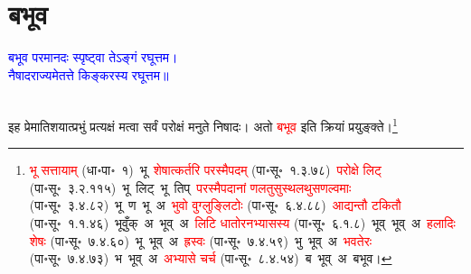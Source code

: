 \section[बभूव]{बभूव}
\centering\textcolor{blue}{बभूव परमानदः स्पृष्ट्वा तेऽङ्गं रघूत्तम।\nopagebreak\\
नैषादराज्यमेतत्ते किङ्करस्य रघूत्तम॥}\nopagebreak\\
\\
\fontsize{14}{21}\selectfont\begin{sloppypar}\justifying\noindent\hspace{10mm} इह प्रेमातिशयात्प्रभुं प्रत्यक्षं मत्वा सर्वं परोक्षं मनुते निषादः। अतो \textcolor{red}{बभूव} इति क्रियां प्रयुङ्क्ते।\footnote{\textcolor{red}{भू सत्तायाम्} (धा॰पा॰~१)~\arrow भू~\arrow \textcolor{red}{शेषात्कर्तरि परस्मैपदम्} (पा॰सू॰~१.३.७८)~\arrow \textcolor{red}{परोक्षे लिट्} (पा॰सू॰~३.२.११५)~\arrow भू~लिट्~\arrow भू~तिप्~\arrow \textcolor{red}{परस्मैपदानां णलतुसुस्थलथुस\-णल्वमाः} (पा॰सू॰~३.४.८२)~\arrow भू~ण~\arrow भू~अ~\arrow \textcolor{red}{भुवो वुग्लुङ्लिटोः} (पा॰सू॰~६.४.८८)~\arrow \textcolor{red}{आद्यन्तौ टकितौ} (पा॰सू॰~१.१.४६)~\arrow भूवुँक्~अ~\arrow भूव्~अ~\arrow \textcolor{red}{लिटि धातोरनभ्यासस्य} (पा॰सू॰~६.१.८)~\arrow भूव्~भूव्~अ~\arrow \textcolor{red}{हलादिः शेषः} (पा॰सू॰~७.४.६०)~\arrow भू~भूव्~अ~\arrow \textcolor{red}{ह्रस्वः} (पा॰सू॰~७.४.५९)~\arrow भु~भूव्~अ~\arrow \textcolor{red}{भवतेरः} (पा॰सू॰~७.४.७३)~\arrow भ~भूव्~अ~\arrow \textcolor{red}{अभ्यासे चर्च} (पा॰सू॰~८.४.५४)~\arrow ब~भूव्~अ~\arrow बभूव।}\end{sloppypar}
